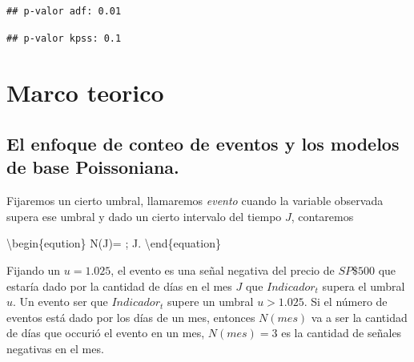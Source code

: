 \documentclass[
  oneside]{article}
\newenvironment{Shaded}{\begin{snugshade}}{\end{snugshade}}
\newcommand{\FunctionTok}[1]{\textcolor[rgb]{0.13,0.29,0.53}{\textbf{#1}}}
\newcommand{\NormalTok}[1]{#1}
\newcommand{\OtherTok}[1]{\textcolor[rgb]{0.56,0.35,0.01}{#1}}
\newcommand{\SpecialCharTok}[1]{\textcolor[rgb]{0.81,0.36,0.00}{\textbf{#1}}}
\newcommand{\StringTok}[1]{\textcolor[rgb]{0.31,0.60,0.02}{#1}}
\begin{document}
\begin{Shaded}
\end{Shaded}

\begin{verbatim}
## p-valor adf: 0.01
\end{verbatim}

\begin{Shaded}
\end{Shaded}

\begin{verbatim}
## p-valor kpss: 0.1
\end{verbatim}

\newpage

\section{Marco teorico}
\subsection{El enfoque de conteo de eventos y los modelos de base Poissoniana.}

Fijaremos un cierto umbral, llamaremos \textit{evento} cuando la
variable observada supera ese umbral y dado un cierto intervalo del
tiempo \(J\), contaremos

\textbackslash begin\{eqution\} N(J)=
; J.
\textbackslash end\{equation\}

Fijando un \(u=1.025\), el evento es una señal negativa del precio de
\(SP\$500\) que estaría dado por la cantidad de días en el mes \(J\) que
\(Indicador_t\) supera el umbral \(u\). Un evento ser que
\(Indicador_t\) supere un umbral \(u>1.025\). Si el número de eventos
está dado por los días de un mes, entonces \(N(mes)\) va a ser la
cantidad de días que occurió el evento en un mes, \(N(mes)=3\) es la
cantidad de señales negativas en el mes.
\end{document}

